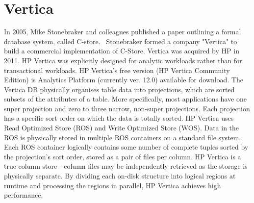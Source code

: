 \section{Vertica}
\label{sec:vertica}

In 2005, Mike Stonebraker and colleagues published a paper
outlining a formal database system, called C-store.~\cite{SABC05} 
Stonebraker formed a company "Vertica" to build a commercial 
implementation of C-Store. Vertica was acquired by HP in 2011.
HP Vertica was explicitly designed for analytic workloads rather than
for transactional workloads. 
HP Vertica’s free version (HP Vertica Community Edition) is Analytics Platform (currently ver. 12.0) available for download.
The Vertica DB physically organises table data into projections, which are sorted subsets of the attributes of a table. 
More specifically, most applications have one super projection and zero to three narrow, non-super projections. 
Each projection has a specific sort order on which the data 
is totally sorted. 
HP Vertica uses Read Optimized Store (ROS) and Write Optimized Store (WOS). 
Data in the ROS is physically stored in multiple ROS containers on a standard file system. 
Each ROS container logically contains some number of complete tuples sorted by the projection's sort order, stored as a pair of files per column. 
HP Vertica is a true column store - column files may be independently retrieved as the storage is physically separate. 
By dividing each on-disk structure into logical regions at runtime and processing the regions in parallel, HP Vertica achieves high performance.~\cite{Harr15}